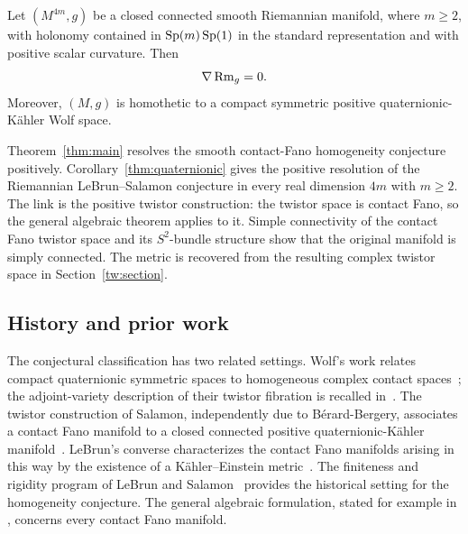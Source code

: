 \begin{corollary}\label{thm:quaternionic}
Let $(M^{4m},g)$ be a closed connected smooth Riemannian manifold,
where $m\geq2$, with holonomy contained in $\operatorname{Sp}(m)\operatorname{Sp}(1)$ in the
standard representation and with positive scalar curvature. Then
\[
 \nabla\operatorname{Rm}_g=0.
\]
Moreover, $(M,g)$ is homothetic to a compact symmetric positive
quaternionic-K\"ahler Wolf space.
\end{corollary}

Theorem~\ref{thm:main} resolves the smooth contact-Fano homogeneity
conjecture positively. Corollary~\ref{thm:quaternionic} gives the
positive resolution of the Riemannian LeBrun--Salamon conjecture in
every real dimension $4m$ with $m\geq2$. The link is the positive
twistor construction: the twistor space is contact Fano, so the
general algebraic theorem applies to it. Simple connectivity of the
contact Fano twistor space and its $S^2$-bundle structure show that
the original manifold is simply connected. The metric is recovered
from the resulting complex twistor space in Section~\ref{tw:section}.

\subsection*{History and prior work}

The conjectural classification has two related settings.  Wolf's work
relates compact quaternionic symmetric spaces to homogeneous complex contact
spaces~\cite{Wolf1965}; the adjoint-variety description of their twistor
fibration is recalled in~\cite[Section~3.9, pp.~105--106]{LandsbergManivel2004}.
The twistor construction of Salamon, independently due to B\'erard-Bergery,
associates a contact Fano manifold to a closed connected positive
quaternionic-K\"ahler manifold~\cite{Salamon1982,LeBrun1995}.  LeBrun's converse characterizes the
contact Fano manifolds arising in this way by the existence of a
K\"ahler--Einstein metric~\cite[Theorem~A]{LeBrun1995}.  The finiteness and
rigidity program of LeBrun and Salamon~\cite{LeBrun1993,LeBrunSalamon1994}
provides the historical setting for the homogeneity conjecture.  The general
algebraic formulation, stated for example in
\cite[Conjecture~1.1]{Buczynski2010}, concerns every contact Fano manifold.

